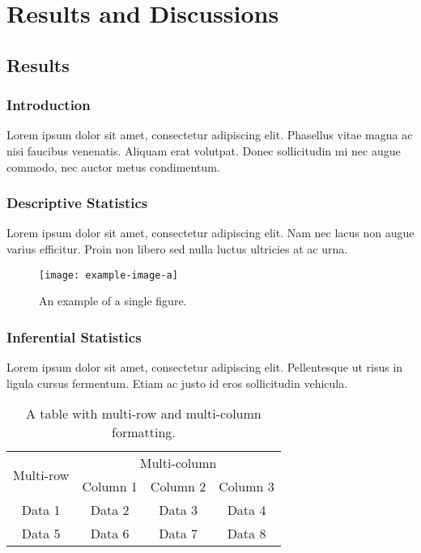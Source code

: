 \chapter{Results and Discussions}
\section{Results}
\subsection{Introduction}
Lorem ipsum dolor sit amet, consectetur adipiscing elit. Phasellus vitae magna ac nisi faucibus venenatis. Aliquam erat volutpat. Donec sollicitudin mi nec augue commodo, nec auctor metus condimentum.

\subsection{Descriptive Statistics}
Lorem ipsum dolor sit amet, consectetur adipiscing elit. Nam nec lacus non augue varius efficitur. \cite{smith2020understanding} Proin non libero sed nulla luctus ultricies at ac urna.
\begin{figure}[ht]
    \centering
    \texttt{[image: example-image-a]}
    \caption{An example of a single figure.}
    \label{fig:single1}
\end{figure}
\subsection{Inferential Statistics}
Lorem ipsum dolor sit amet, consectetur adipiscing elit. Pellentesque ut risus in ligula cursus fermentum. Etiam ac justo id eros sollicitudin vehicula.

\begin{table}[ht]
    \centering
    \begin{tabular}{|c|c|c|c|}
        \hline
        \multirow{2}{*}{Multi-row} & \multicolumn{3}{c|}{Multi-column} \\
        \cline{2-4}
         & Column 1 & Column 2 & Column 3 \\
        \hline
        Data 1 & Data 2 & Data 3 & Data 4 \\
        \hline
        Data 5 & Data 6 & Data 7 & Data 8 \\
        \hline
    \end{tabular}
    \caption{A table with multi-row and multi-column formatting.}
    \label{tab:multi}
\end{table}
